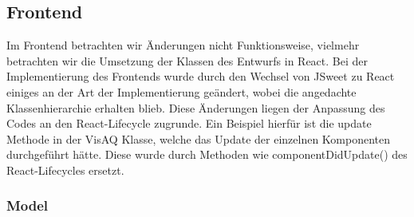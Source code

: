 \subsection{Frontend}
Im Frontend betrachten wir Änderungen nicht Funktionsweise, vielmehr betrachten wir die Umsetzung der Klassen des Entwurfs in React.
Bei der Implementierung des Frontends wurde durch den Wechsel von JSweet zu React einiges an der Art der Implementierung geändert, wobei die angedachte Klassenhierarchie erhalten blieb.
Diese Änderungen liegen der Anpassung des Codes an den \gls{React-Lifecycle} zugrunde. Ein Beispiel hierfür ist die update Methode in der VisAQ Klasse, welche das Update der einzelnen Komponenten
durchgeführt hätte. Diese wurde durch Methoden wie componentDidUpdate() des \gls{React-Lifecycle}s ersetzt. 

\subsubsection{Model}
\toJSON
{}
\toJSON
{}
\toJSON
{}
\toJSON
{}
\toJSON
{}
\toJSON
{}
\toJSON
{}
\toJSON
{}
\toJSON
{}
\toJSON
{}
\toJSON
{}
\toJSON

